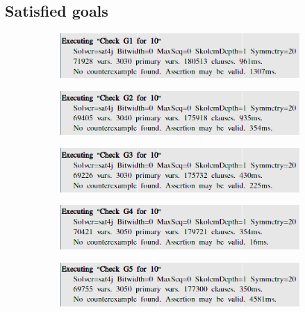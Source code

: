 \documentclass{article}
\begin{document}
	\subsection{Satisfied goals}
	\label{Alloy:Goals}
	\begin{figure}[H]
		\begin{subfigure}[H]{\linewidth}
			\includegraphics[width=\linewidth]{Images/Alloy_G1.png}
		\end{subfigure}
		\begin{subfigure}[H]{\linewidth}
			\includegraphics[width=\linewidth]{Images/Alloy_G2.png}
		\end{subfigure}
		\begin{subfigure}[H]{\linewidth}
			\includegraphics[width=\linewidth]{Images/Alloy_G3.png}
		\end{subfigure}
		\begin{subfigure}[H]{\linewidth}
			\includegraphics[width=\linewidth]{Images/Alloy_G4.png}
		\end{subfigure}
		\begin{subfigure}[H]{\linewidth}
			\includegraphics[width=\linewidth]{Images/Alloy_G5.png}

\end{subfigure}
\end{figure}
\end{document}
